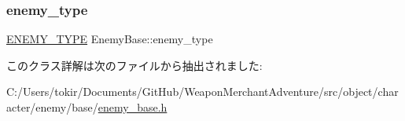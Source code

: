\mbox{\label{class_enemy_base_a34ad22e6b0d06b8d63c207c843383eba}} 
\subsubsection{\texorpdfstring{enemy\+\_\+type}{enemy\_type}}
{\footnotesize\ttfamily \mbox{\hyperlink{enemy__base_8h_aef73e23ea1cdc9dda520bbb81af707db}{E\+N\+E\+M\+Y\+\_\+\+T\+Y\+PE}} Enemy\+Base\+::enemy\+\_\+type}



このクラス詳解は次のファイルから抽出されました\+:\begin{DoxyCompactItemize}
\item 
C\+:/\+Users/tokir/\+Documents/\+Git\+Hub/\+Weapon\+Merchant\+Adventure/src/object/character/enemy/base/\mbox{\hyperlink{enemy__base_8h}{enemy\+\_\+base.\+h}}\end{DoxyCompactItemize}

